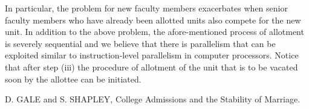 \documentclass[a4paper,10pt]{article}
\begin{document}
%
In particular, the problem for new faculty members exacerbates when
senior faculty members who have already been allotted units also
compete for the new unit.
%
In addition to the above problem, the afore-mentioned process of
allotment is severely sequential and we believe that there is
parallelism that can be exploited similar to instruction-level
parallelism in computer processors. Notice that after step (iii) the
procedure of allotment of the unit that is to be vacated soon by the
allottee can be initiated.





\begin{thebibliography}{9}
D. GALE and S. SHAPLEY, 
College Admissions and the Stability of Marriage. 

\end{thebibliography}
\end{document}
